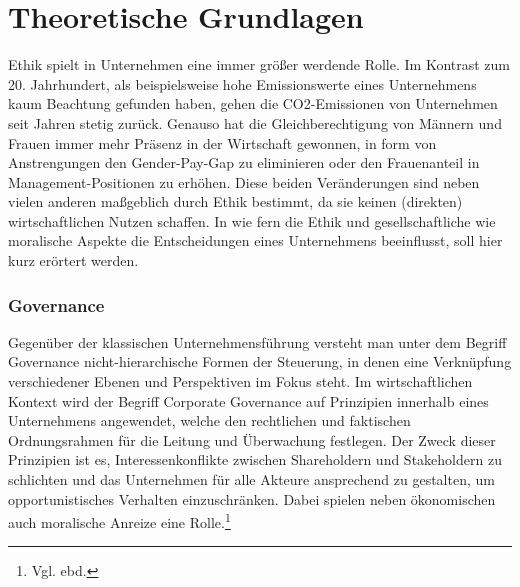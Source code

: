 \documentclass[12pt]{article}
\begin{document}
\renewcommand{\mytitle}{Governanceethik und\\moralische Anreize}%
\renewcommand{\myauthor}{Lennart Schulte-Kellinghaus,\\Timo Stovermann}%
\renewcommand{\headheight}{27pt}%



\frontmatter%


\printabbreviations%
\clearpage
\renewcommand{\plaintitle}{Inhaltsverzeichnis}%
{\def\makebox[#1][#2]#3{#3}%
	\tableofcontents
}


\clearpage
\mainmatter%

\part{Theoretische Grundlagen}
Ethik spielt in Unternehmen eine immer größer werdende Rolle. Im Kontrast zum 20. Jahrhundert, als beispielsweise hohe Emissionswerte eines Unternehmens kaum Beachtung gefunden haben, gehen die CO2-Emissionen von Unternehmen seit Jahren stetig zurück. Genauso hat die Gleichberechtigung von Männern und Frauen immer mehr Präsenz in der Wirtschaft gewonnen, in form von Anstrengungen den Gender-Pay-Gap zu eliminieren oder den Frauenanteil in Management-Positionen zu erhöhen. Diese beiden Veränderungen sind neben vielen anderen maßgeblich durch Ethik bestimmt, da sie keinen (direkten) wirtschaftlichen Nutzen schaffen. In wie fern die Ethik und gesellschaftliche wie moralische Aspekte die Entscheidungen eines Unternehmens beeinflusst, soll hier kurz erörtert werden.
\section{Governance}
Gegenüber der klassischen Unternehmensführung versteht man unter dem Begriff Governance nicht-hierarchische Formen der Steuerung, in denen eine Verknüpfung verschiedener Ebenen und Perspektiven im Fokus steht. Im wirtschaftlichen Kontext wird der Begriff Corporate Governance auf Prinzipien innerhalb eines Unternehmens angewendet, welche den rechtlichen und faktischen Ordnungsrahmen für die Leitung und Überwachung festlegen. Der Zweck dieser Prinzipien ist es, Interessenkonflikte zwischen Shareholdern und Stakeholdern zu schlichten und das Unternehmen für alle Akteure ansprechend zu gestalten, um opportunistisches Verhalten einzuschränken. Dabei spielen neben ökonomischen auch moralische Anreize eine Rolle.\footnote{Vgl. ebd.}
\end{document}
